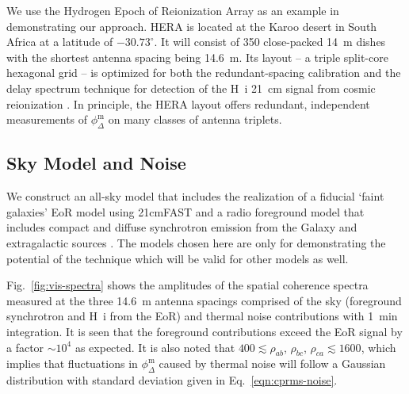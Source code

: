 \documentclass[
reprint,
superscriptaddress,
amsmath,
amssymb,
aps,
prd
]{revtex4-1}
\begin{document}
We use the Hydrogen Epoch of Reionization Array \cite[HERA;][]{deb17,thy16,ewa16,neb16,patra17} as an example in demonstrating our approach. HERA is located at the Karoo desert in South Africa at a latitude of $-30.73^\circ$. It will consist of 350 close-packed 14~m dishes with the shortest antenna spacing being 14.6~m. Its layout -- a triple split-core hexagonal grid -- is optimized for both the redundant-spacing calibration and the delay spectrum technique for detection of the H~{\sc i} 21~cm signal from cosmic reionization \cite{dil16}. 
In principle, the HERA layout offers redundant, independent measurements of $\phi_\Delta^\textrm{m}$ on many classes of antenna triplets. 

\subsection{Sky Model and Noise}\label{sec:skymodel-noise}

We construct an all-sky model that includes the realization of a fiducial `faint galaxies' EoR model \cite{gre17} using 21cmFAST \cite{mes11} and a radio foreground model that includes compact and diffuse synchrotron emission from the Galaxy and extragalactic sources \cite{thy15a}. The models chosen here are only for demonstrating the potential of the technique which will be valid for other models as well.

Fig.~\ref{fig:vis-spectra} shows the amplitudes of the spatial coherence spectra measured at the three 14.6~m antenna spacings comprised of the sky (foreground synchrotron and H~{\sc i} from the EoR) and thermal noise contributions with 1~min integration. It is seen that the foreground contributions exceed the EoR signal by a factor $\sim 10^4$ as expected. It is also noted that $400\lesssim \rho_{ab},\,\rho_{bc},\,\rho_{ca} \lesssim 1600$, which implies that fluctuations in $\phi_\Delta^\textrm{m}$ caused by thermal noise will follow a Gaussian distribution with standard deviation given in Eq.~\ref{eqn:cprms-noise}.
\end{document}
